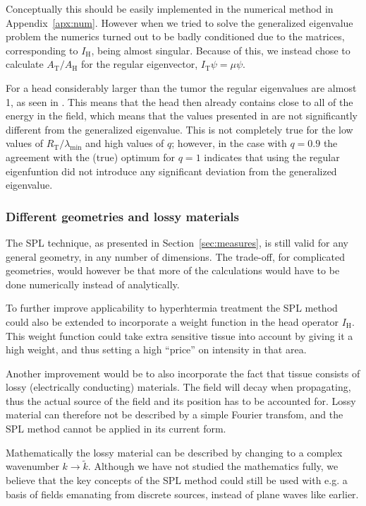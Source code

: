 \documentclass[11pt,a4paper, 
swedish,english %
]{article}
\newcommand{\RT}{\ensuremath{R_{\text{T}}}}
\begin{document}
Conceptually this should be easily implemented in the numerical method
in Appendix~\ref{apx:num}. However when we tried to solve the
generalized eigenvalue problem the numerics turned out to be badly
conditioned due to the matrices, corresponding to $I_\text{H}$, being
almost singular. Because of this, we instead chose to calculate
$A_\text{T}/A_\text{H}$ for the regular eigenvector,
$I_\text{T}\psi=\mu\psi$. 

For a head considerably larger than the tumor the
regular eigenvalues are almost 1, as seen in . This
means that the head then already contains close to all of the energy
in the field, which means that the values presented in
 are not significantly different from the generalized
eigenvalue. 
This is not completely true for the low values of
$\RT/\lambda_{\min}$ and high values of $q$; however, in the case with
$q=0.9$ the agreement with the (true) optimum for $q=1$ indicates that
using the regular eigenfuntion did not introduce any significant
deviation from the generalized eigenvalue.


\subsubsection{Different geometries and lossy materials}
The SPL technique, as presented in Section~\ref{sec:measures}, is
still valid for any general geometry, in any number of dimensions.
The trade-off, for complicated geometries, would however be that more
of the calculations would have to be done numerically instead of 
analytically. 

To further improve applicability to hyperhtermia treatment the SPL
method could also be extended to incorporate a weight function in the
head operator $I_\text{H}$. This weight function could take extra
sensitive tissue into account by giving it a high weight, and thus
setting a high ``price'' on intensity in that area. 

Another improvement would be to also incorporate the fact that tissue
consists of lossy (electrically conducting) materials. 
The field will decay when propagating, thus the
actual source of the field and its position has to be accounted
for. Lossy material can therefore not be described by a simple 
Fourier transfom, and the SPL method cannot be applied in its current
form. 

Mathematically the lossy material can be described by changing to a complex
wavenumber $k\to\tilde{k}$. Although we have not studied the mathematics 
fully, we believe that the key concepts of the SPL method could
still be used with e.g. a basis of fields emanating from discrete sources, 
instead of plane waves like earlier. 
\end{document}
